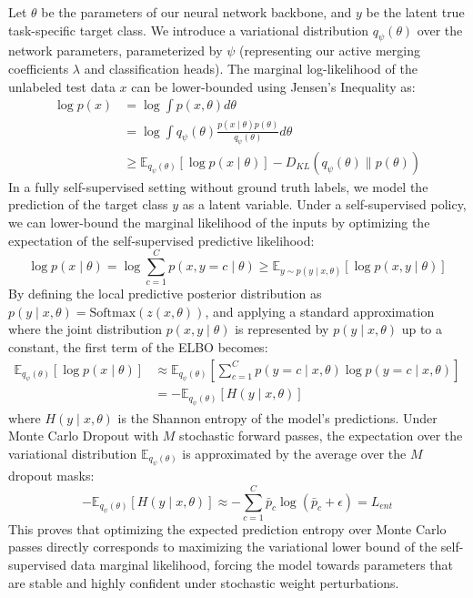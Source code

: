 \documentclass{article}
\theoremstyle{plain}
\theoremstyle{definition}
\theoremstyle{remark}
\begin{document}
Let $\theta$ be the parameters of our neural network backbone, and $y$ be the latent true task-specific target class. We introduce a variational distribution $q_\psi(\theta)$ over the network parameters, parameterized by $\psi$ (representing our active merging coefficients $\lambda$ and classification heads).
The marginal log-likelihood of the unlabeled test data $x$ can be lower-bounded using Jensen's Inequality as:
\begin{align}
  \log p(x) &= \log \int p(x, \theta) d\theta \\
            &= \log \int q_\psi(\theta) \frac{p(x \mid \theta) p(\theta)}{q_\psi(\theta)} d\theta \\
            &\geq \mathbb{E}_{q_\psi(\theta)} [ \log p(x \mid \theta) ] - D_{KL}(q_\psi(\theta) \parallel p(\theta))
\end{align}
In a fully self-supervised setting without ground truth labels, we model the prediction of the target class $y$ as a latent variable. Under a self-supervised policy, we can lower-bound the marginal likelihood of the inputs by optimizing the expectation of the self-supervised predictive likelihood:
\begin{equation}
  \log p(x \mid \theta) = \log \sum_{c=1}^C p(x, y=c \mid \theta) \geq \mathbb{E}_{y \sim p(y \mid x, \theta)} [ \log p(x, y \mid \theta) ]
\end{equation}
By defining the local predictive posterior distribution as $p(y \mid x, \theta) = \text{Softmax}(z(x, \theta))$, and applying a standard approximation where the joint distribution $p(x, y \mid \theta)$ is represented by $p(y \mid x, \theta)$ up to a constant, the first term of the ELBO becomes:
\begin{align}
  \mathbb{E}_{q_\psi(\theta)} [ \log p(x \mid \theta) ] &\approx \mathbb{E}_{q_\psi(\theta)} \left[ \sum_{c=1}^C p(y=c \mid x, \theta) \log p(y=c \mid x, \theta) \right] \\
  &= - \mathbb{E}_{q_\psi(\theta)} [ H(y \mid x, \theta) ]
\end{align}
where $H(y \mid x, \theta)$ is the Shannon entropy of the model's predictions. Under Monte Carlo Dropout with $M$ stochastic forward passes, the expectation over the variational distribution $\mathbb{E}_{q_\psi(\theta)}$ is approximated by the average over the $M$ dropout masks:
\begin{equation}
  - \mathbb{E}_{q_\psi(\theta)} [ H(y \mid x, \theta) ] \approx - \sum_{c=1}^C \bar{p}_c \log(\bar{p}_c + \epsilon) = L_{ent}
\end{equation}
This proves that optimizing the expected prediction entropy over Monte Carlo passes directly corresponds to maximizing the variational lower bound of the self-supervised data marginal likelihood, forcing the model towards parameters that are stable and highly confident under stochastic weight perturbations.
\end{document}

